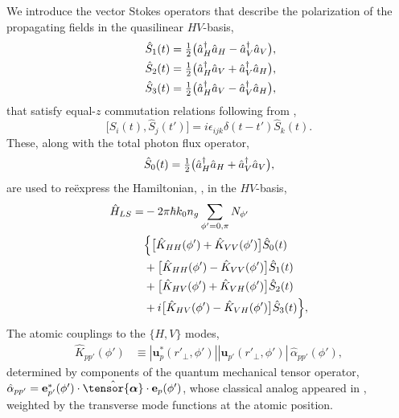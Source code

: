 \documentclass[aps,pra,twocolumn]{revtex4-1} %
\newcommand{\poltens}{\hat{\tensor{\boldsymbol{\alpha}}}}
\newcommand{\polcomp}{\hat{K}} %
\begin{document}
We introduce the vector Stokes operators that describe the polarization of the propagating fields in the quasilinear $HV$-basis,
\begin{subequations} \label{Eq::StokesComponents}
	\begin{align}
		\hat{S}_1(t) &= \mbox{$\frac{1}{2}$}\big( \hat{a}^\dag_H \hat{a}_H-\hat{a}^\dag_V \hat{a}_V \big), \\
		\; \hat{S}_2(t)	&= \mbox{$\frac{1}{2}$}\big( \hat{a}^\dag_H \hat{a}_V+\hat{a}^\dag_V \hat{a}_H \big), \\
		\hat{S}_3(t) &= \mbox{$\frac{1}{2}$}\big( \hat{a}^\dag_H \hat{a}_V-\hat{a}^\dag_V \hat{a}_H \big),
	\end{align}
\end{subequations}
that satisfy equal-$z$ commutation relations following from ,
	\begin{equation} \label{Eq::StokesCommutation}
		\big[\hat{S}_i(t), \hat{S}_j(t')\big] =i \epsilon_{ijk} \delta(t-t')  \hat{S}_k(t).
	\end{equation}
These, along with the total photon flux operator,
	\begin{equation}
		\hat{S}_0(t) = \mbox{$\frac{1}{2}$}\big( \hat{a}^\dag_H \hat{a}_H+\hat{a}^\dag_V \hat{a}_V \big),
	\end{equation}
are used to re\"{e}xpress the Hamiltonian, , in the $HV$-basis,
	\begin{align}  
		\hat{H}_{LS} 	=& - 2 \pi \hbar k_0 n_g \sum_{\phi'=0,\pi}N_{\phi'} \nn\\
		&\Big\{ \big[ \polcomp_{HH}(\phi')+\polcomp_{VV}(\phi') \big] \hat{S}_0(t) \nn\\
		&+  \big[\polcomp_{HH}(\phi')  - \polcomp_{VV}(\phi')  \big] \hat{S}_1(t) \nonumber \\
&+ \big[\polcomp_{HV}(\phi') + \polcomp_{VH}(\phi')  \big] \hat{S}_2(t) \nn\\
&+ i  \big[ \polcomp_{HV}(\phi')-\polcomp_{VH}(\phi') \big]\hat{S}_3(t) \Big\}, \label{Eq::GenHamiltonian} 
	\end{align}
The atomic couplings to the $\{H,V\}$ modes,
	\begin{align} 
		\polcomp_{p p'}(\phi') & \equiv |\mathbf{u}^*_p(r'_\perp, \phi')||\mathbf{u}_{p'}(r'_\perp, \phi')| \, \hat{\alpha}_{p p'}(\phi') , 
	\end{align}
determined by components of the quantum mechanical tensor operator, $\hat{\alpha}_{p p'} = \mathbf{e}^*_{p'}(\phi') \cdot \poltens \cdot \mathbf{e}_{p}(\phi') $, whose classical analog appeared in , weighted by the transverse mode functions at the atomic position.
\end{document}
